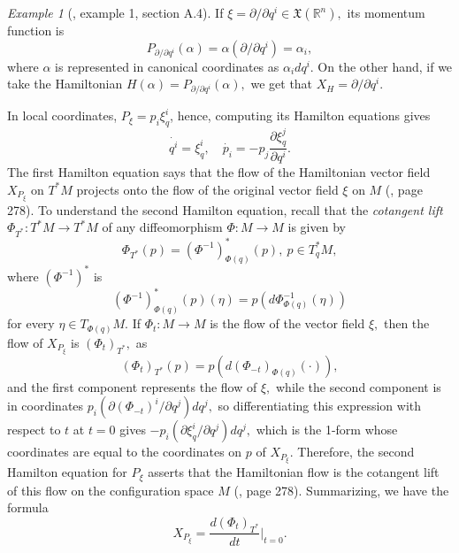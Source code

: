 \documentclass[12pt, letterpaper, reqno]{amsart}
\theoremstyle{definition}
\theoremstyle{plain}
\theoremstyle{remark}
\newtheorem{ex}{Example}
\begin{document}
\begin{ex}[\cite{montgomery2002tour}, example 1, section A.4]
	If $ \xi=\partial/\partial q^i\in \mathfrak{X}( \mathbb{R}^n), $ its momentum function is
	$$ P_{\partial/\partial q^i}(\alpha)=\alpha(\partial/\partial q^i) = \alpha_i, $$ 
	where $ \alpha$ is represented in canonical coordinates as $ \alpha_i dq^i $. On the other hand, if we take the Hamiltonian $ H(\alpha)=P_{\partial/\partial q^i}(\alpha), $ we get that $ X_H=\partial /\partial q^i. $ 
\end{ex}

In local coordinates, $ P_\xi = p_i \xi_q^i $, hence, computing its Hamilton equations gives
$$ \dot{q^i} = \xi_q^i,\quad \dot{p_i} = -p_j \frac{\partial \xi_q^j}{\partial q^i}.  $$ 
The first Hamilton equation says that the flow of the Hamiltonian vector field $ X_{P_\xi} $ on $ T^*M $ projects onto the flow of the original vector field $ \xi $ on $ M $ (\cite{montgomery2002tour}, page 278). To understand the second Hamilton equation, recall that the \textit{cotangent lift} $ \Phi_{T^*}: T^*M \rightarrow T^*M $ of any diffeomorphism $ \Phi : M \rightarrow M $ is given by 
$$ \Phi_{T^*}(p) = (\Phi^{-1})^*_{\Phi(q)}(p),\ p\in T^*_qM,$$ 
where $ (\Phi^{-1})^* $ is 
$$ (\Phi^{-1})^*_{\Phi(q)}(p)(\eta) = p \left( d\Phi^{-1}_{\Phi(q)}(\eta) \right) $$ 
for every $ \eta\in T_{\Phi(q)}M. $ If $ \Phi_t: M \rightarrow M $ is the flow of the vector field $ \xi, $ then the flow of $ X_{P_\xi} $ is $ (\Phi_t)_{T^*}, $ as
$$ (\Phi_t)_{T^*}(p) = p \left( d(\Phi_{-t})_{\Phi(q)}(\cdot) \right), $$ 
and the first component represents the flow of $ \xi, $ while the second component is in coordinates $ p_i (\partial (\Phi_{-t})^i/\partial q^j)dq^j, $ so differentiating this expression with respect to $ t $ at $ t=0 $ gives $ -p_i (\partial \xi_q^i/\partial q^j)dq^j, $ which is the 1-form whose coordinates are equal to the coordinates on $ p $ of $ X_{P_\xi} $. Therefore, the second Hamilton equation for $ P_\xi $ asserts that the Hamiltonian flow is the cotangent lift of this flow on the configuration space $ M $ (\cite{montgomery2002tour}, page 278). Summarizing, we have the formula 
$$ X_{P_\xi} = \frac{d(\Phi_t)_{T^*}}{dt} \Big|_{t=0}.  $$ 
\end{document}
